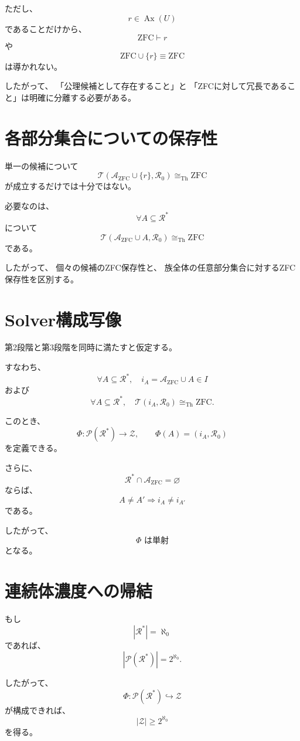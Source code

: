 \documentclass[11pt,a4paper]{article}
\begin{document}
ただし、
\[
r\in\operatorname{Ax}(U)
\]
であることだけから、
\[
\mathrm{ZFC}\vdash r
\]
や
\[
\mathrm{ZFC}\cup\{r\}\equiv\mathrm{ZFC}
\]
は導かれない。

したがって、
「公理候補として存在すること」と
「ZFCに対して冗長であること」は明確に分離する必要がある。

\section{各部分集合についての保存性}

単一の候補について
\[
\mathcal T(\mathcal A_{\mathrm{ZFC}}\cup\{r\},\mathcal R_0)
\cong_{\mathrm{Th}}\mathrm{ZFC}
\]
が成立するだけでは十分ではない。

必要なのは、
\[
\forall A\subseteq\mathcal R^*
\]
について
\[
\mathcal T(\mathcal A_{\mathrm{ZFC}}\cup A,\mathcal R_0)
\cong_{\mathrm{Th}}\mathrm{ZFC}
\]
である。

したがって、
個々の候補のZFC保存性と、
族全体の任意部分集合に対するZFC保存性を区別する。

\section{Solver構成写像}

第2段階と第3段階を同時に満たすと仮定する。

すなわち、
\[
\forall A\subseteq\mathcal R^*,
\quad
i_A=\mathcal A_{\mathrm{ZFC}}\cup A\in I
\]
および
\[
\forall A\subseteq\mathcal R^*,
\quad
\mathcal T(i_A,\mathcal R_0)
\cong_{\mathrm{Th}}\mathrm{ZFC}.
\]

このとき、
\[
\boxed{
\Phi:
\mathcal P(\mathcal R^*)
\longrightarrow
\mathcal Z,
\qquad
\Phi(A)=(i_A,\mathcal R_0)
}
\]
を定義できる。

さらに、
\[
\mathcal R^*\cap\mathcal A_{\mathrm{ZFC}}=\varnothing
\]
ならば、
\[
A\neq A'
\Longrightarrow
i_A\neq i_{A'}
\]
である。

したがって、
\[
\boxed{
\Phi\text{ は単射}
}
\]
となる。

\section{連続体濃度への帰結}

もし
\[
|\mathcal R^*|=\aleph_0
\]
であれば、
\[
|\mathcal P(\mathcal R^*)|
=
2^{\aleph_0}.
\]

したがって、
\[
\Phi:\mathcal P(\mathcal R^*)\hookrightarrow\mathcal Z
\]
が構成できれば、
\[
\boxed{
|\mathcal Z|\geq2^{\aleph_0}
}
\]
を得る。
\end{document}
